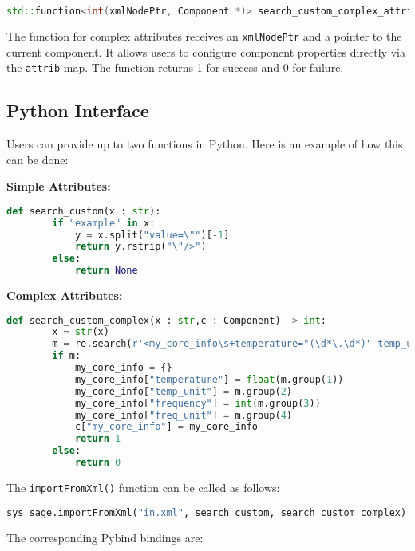     \begin{lstlisting}[language=C++, xleftmargin=4em, frame = single]
    std::function<int(xmlNodePtr, Component *)> search_custom_complex_attrib_key_fcn = NULL;
    \end{lstlisting}
    The function for complex attributes receives an \verb|xmlNodePtr| and a pointer to the current component. It allows users to configure component properties directly via the \verb|attrib| map. The function returns 1 for success and 0 for failure.

\subsection{Python Interface}

Users can provide up to two functions in Python. Here is an example of how this can be done:

\textbf{Simple Attributes:}
    \begin{lstlisting}[language=Python, xleftmargin=4em, frame = single]
    def search_custom(x : str):
        if "example" in x:
            y = x.split("value=\"")[-1]
            return y.rstrip("\"/>")
        else:
            return None
    \end{lstlisting}
\textbf{Complex Attributes:}
    \begin{lstlisting}[language=Python, xleftmargin=4em, frame = single]
    def search_custom_complex(x : str,c : Component) -> int:
        x = str(x)
        m = re.search(r'<my_core_info\s+temperature="(\d*\.\d*)" temp_unit="(\w*)" frequency="(\d*)" freq_unit="(\w*)"/>', x)
        if m:
            my_core_info = {}
            my_core_info["temperature"] = float(m.group(1))
            my_core_info["temp_unit"] = m.group(2)
            my_core_info["frequency"] = int(m.group(3))
            my_core_info["freq_unit"] = m.group(4)
            c["my_core_info"] = my_core_info
            return 1
        else:
            return 0
    \end{lstlisting}

The \verb|importFromXml()| function can be called as follows:

\begin{lstlisting}[language=Python, xleftmargin=4em, frame = single]
sys_sage.importFromXml("in.xml", search_custom, search_custom_complex)
\end{lstlisting}

The corresponding Pybind bindings are:

